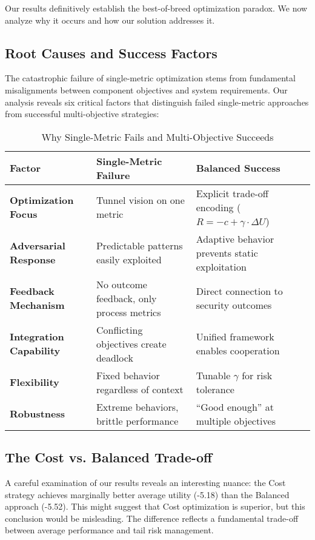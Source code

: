\documentclass[10pt,conference]{IEEEtran}
\begin{document}
Our results definitively establish the best-of-breed optimization paradox. We now analyze why it occurs and how our solution addresses it.

\subsection{Root Causes and Success Factors}

The catastrophic failure of single-metric optimization stems from fundamental misalignments between component objectives and system requirements. Our analysis reveals six critical factors that distinguish failed single-metric approaches from successful multi-objective strategies:

\begin{table*}[!ht]
\centering
\caption{Why Single-Metric Fails and Multi-Objective Succeeds}
\footnotesize
\begin{tabular}{@{}p{3.5cm}p{5.5cm}p{5.5cm}@{}}
\toprule
\textbf{Factor} & \textbf{Single-Metric Failure} & \textbf{Balanced Success} \\
\midrule
\textbf{Optimization Focus} & Tunnel vision on one metric & Explicit trade-off encoding ($R = -c + \gamma \cdot \Delta U$) \\
\textbf{Adversarial Response} & Predictable patterns easily exploited & Adaptive behavior prevents static exploitation \\
\textbf{Feedback Mechanism} & No outcome feedback, only process metrics & Direct connection to security outcomes \\
\textbf{Integration Capability} & Conflicting objectives create deadlock & Unified framework enables cooperation \\
\textbf{Flexibility} & Fixed behavior regardless of context & Tunable $\gamma$ for risk tolerance \\
\textbf{Robustness} & Extreme behaviors, brittle performance & ``Good enough'' at multiple objectives \\
\bottomrule
\end{tabular}
\end{table*}

\subsection{The Cost vs. Balanced Trade-off}

A careful examination of our results reveals an interesting nuance: the Cost strategy achieves marginally better average utility (-5.18) than the Balanced approach (-5.52). This might suggest that Cost optimization is superior, but this conclusion would be misleading. The difference reflects a fundamental trade-off between average performance and tail risk management.
\end{document}
